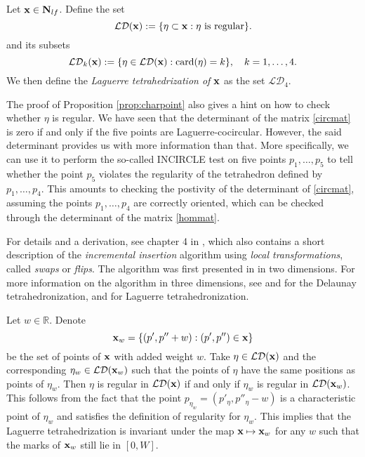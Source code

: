 \begin{definition}
	Let ${\mathbf{x}} \in \mathbf N_{lf}$. Define the set 
	$$\mathcal {LD}({\mathbf{x}}) := \{\eta\subset {\mathbf{x}}: \eta \text{ is regular}\}.$$
	and its subsets
	$$\mathcal {LD}_k({\mathbf{x}}) := \{\eta \in \mathcal {LD}({\mathbf{x}}): \mathrm{card}(\eta)=k \},\quad k = 1,\dots,4.$$
	We then define the \textit{Laguerre tetrahedrization of ${\mathbf{x}}$} as the set $\mathcal {LD}_4$. 
\end{definition}



\begin{remark}\label{r:construct}
	The proof of Proposition \ref{prop:charpoint} also gives a hint on how to check whether $\eta$ is regular. We have seen that the determinant of the matrix \eqref{circmat} is zero if and only if the five points are Laguerre-cocircular. However, the said determinant provides us with more information than that. More specifically, we can use it to perform the so-called INCIRCLE test on five points $p_1,\dots, p_5$ to tell whether the point $p_5$ violates the regularity of the tetrahedron defined by $p_1,\dots, p_4$. This amounts to checking the postivity of the determinant of \eqref{circmat}, assuming the points $p_1,\dots, p_4$ are correctly oriented, which can be checked through the determinant of the matrix \eqref{hommat}. \newline
	
	For details and a derivation, see chapter 4 in \cite{Gavrilova}, which also contains a short description of the \textit{incremental insertion} algorithm using \textit{local transformations}, called \textit{swaps} or \textit{flips}. The algorithm was first presented in \cite{Lawson72} in two dimensions. For more information on the algorithm in three dimensions, see \cite{Joe89} and \cite{Joe91} for the Delaunay tetrahedronization, and \cite{Edelsbrunner1996} for Laguerre tetrahedronization.
\end{remark}



\begin{remark}\label{rem:invariance}
	Let $w\in \mathbb R$. Denote 
	$${\mathbf{x}}_w = \{(p',p''+w): (p',p'')\in{\mathbf{x}}\}$$ be the set of points of ${\mathbf{x}}$ with added weight $w$. Take $\eta \in \mathcal {LD}({\mathbf{x}})$ and the corresponding $\eta_w \in \mathcal {LD}({\mathbf{x}}_w)$ such that the points of $\eta$ have the same positions as points of $\eta_w$. Then $\eta$ is regular in $\mathcal {LD}({\mathbf{x}})$ if and only if $\eta_w$ is  regular in $\mathcal {LD}({\mathbf{x}}_w)$. This follows from the fact that the point $p_{\eta_w} = (p'_{\eta}, p''_{\eta} -w)$ is a characteristic point of $\eta_w$ and satisfies the definition of regularity for $\eta_w$. This implies that the Laguerre tetrahedrization is invariant under the map ${\mathbf{x}} \mapsto {\mathbf{x}}_w$ for any $w$ such that the marks of ${\mathbf{x}}_w$ still lie in $[0,W]$.
\end{remark}

